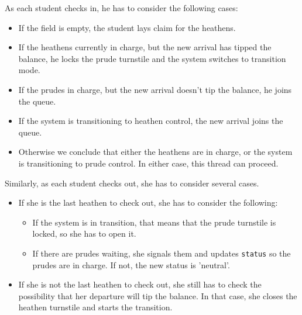 \documentclass{book}
\begin{document}
As each student checks in, he has to
consider the following cases:

\begin{itemize}

\item If the field is empty, the student lays claim for the heathens.

\item If the heathens currently in charge, but the new arrival
has tipped the balance, he locks the prude turnstile and the
system switches to transition mode.

\item If the prudes in charge, but the new arrival doesn't
tip the balance, he joins the queue.

\item If the system is transitioning to heathen control, the new arrival
joins the queue.

\item Otherwise we conclude that either the heathens are in charge, or the
system is transitioning to prude control.  In either case, this
thread can proceed.

\end{itemize}  

Similarly, as each student checks out, she has to consider several
cases.  

\begin{itemize}

\item If she is the last heathen to check out, she has to
consider the following:

    \begin{itemize}

    \item If the system is in transition, that means that the prude
      turnstile is locked, so she has to open it.

    \item If there are prudes waiting, she signals them and
      updates {\tt status} so the prudes are in charge.  If not, the
      new status is 'neutral'.

    \end{itemize}  

\item If she is not the last heathen to check out, she still has to
check the possibility that her departure will tip the balance.  In
that case, she closes the heathen turnstile and starts the
transition.

\end{itemize}
\end{document}
